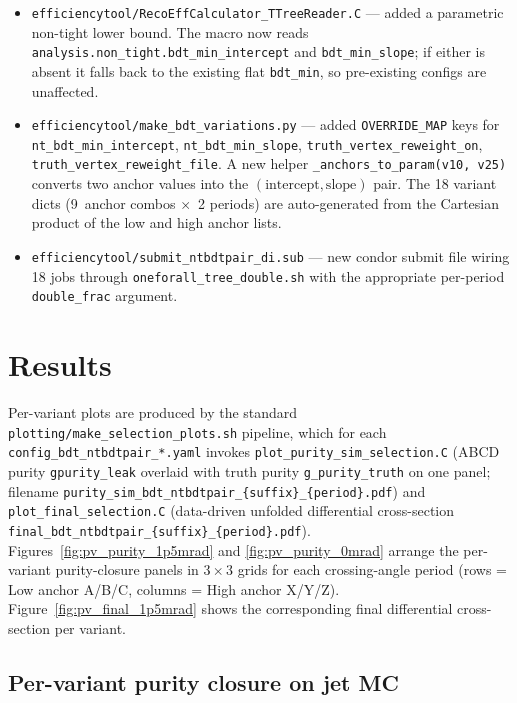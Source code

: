 \documentclass[11pt]{article}
\begin{document}
\begin{itemize}
  \item \texttt{efficiencytool/RecoEffCalculator\_TTreeReader.C} — added a
        parametric non-tight lower bound. The macro now reads
        \texttt{analysis.non\_tight.bdt\_min\_intercept} and
        \texttt{bdt\_min\_slope}; if either is absent it falls back to the
        existing flat \texttt{bdt\_min}, so pre-existing configs are
        unaffected.
  \item \texttt{efficiencytool/make\_bdt\_variations.py} — added
        \texttt{OVERRIDE\_MAP} keys for \texttt{nt\_bdt\_min\_intercept},
        \texttt{nt\_bdt\_min\_slope}, \texttt{truth\_vertex\_reweight\_on},
        \texttt{truth\_vertex\_reweight\_file}. A new helper
        \texttt{\_anchors\_to\_param(v10, v25)} converts two anchor values
        into the $(\text{intercept}, \text{slope})$ pair. The 18 variant
        dicts (9~anchor combos $\times$~2 periods) are auto-generated
        from the Cartesian product of the low and high anchor lists.
  \item \texttt{efficiencytool/submit\_ntbdtpair\_di.sub} — new condor
        submit file wiring 18 jobs through
        \texttt{oneforall\_tree\_double.sh} with the appropriate
        per-period \texttt{double\_frac} argument.
\end{itemize}

\section{Results}

Per-variant plots are produced by the standard
\texttt{plotting/make\_selection\_plots.sh} pipeline, which for each
\texttt{config\_bdt\_ntbdtpair\_*.yaml} invokes
\texttt{plot\_purity\_sim\_selection.C} (ABCD purity
\texttt{gpurity\_leak} overlaid with truth purity
\texttt{g\_purity\_truth} on one panel; filename
\texttt{purity\_sim\_bdt\_ntbdtpair\_\{suffix\}\_\{period\}.pdf}) and
\texttt{plot\_final\_selection.C} (data-driven unfolded differential
cross-section \texttt{final\_bdt\_ntbdtpair\_\{suffix\}\_\{period\}.pdf}).
Figures~\ref{fig:pv_purity_1p5mrad} and \ref{fig:pv_purity_0mrad}
arrange the per-variant purity-closure panels in $3\times3$ grids for
each crossing-angle period (rows = Low anchor A/B/C, columns = High
anchor X/Y/Z). Figure~\ref{fig:pv_final_1p5mrad} shows the corresponding final
differential cross-section per variant.

\subsection{Per-variant purity closure on jet MC}
\end{document}
